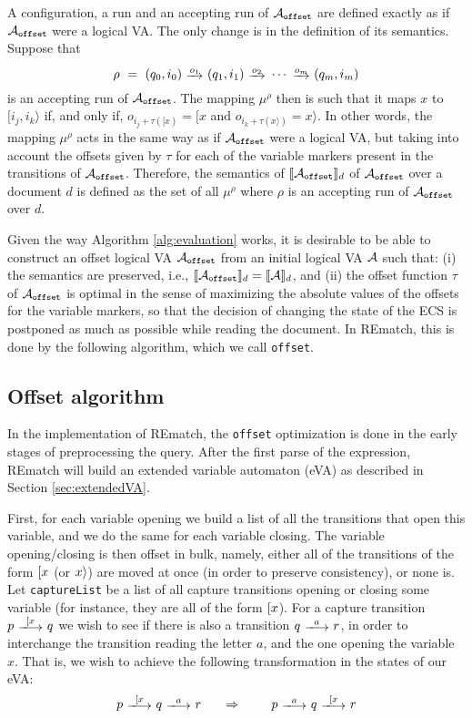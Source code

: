 A configuration, a run and an accepting run of $\mathcal{A}_{\texttt{offset}}$ are defined exactly as
if $\mathcal{A}_{\texttt{offset}}$ were a logical VA. The only change is in the definition of its
semantics. Suppose that 
$$
	\rho \ = \ (q_0, i_0) \ \trans{o_1} \ (q_1, i_1) \ \trans{o_2} \ \cdots \ \trans{o_m} \ (q_m, i_m)
$$
is an accepting run of $\mathcal{A}_{\texttt{offset}}$. The mapping $\mu^\rho$ then is such that it
maps $x$ to $[i_j, i_k\rangle$ if, and only if, $o_{i_j + \tau([x)} = [x$ and
$o_{i_k + \tau(x\rangle)} = x\rangle$. In other words, the mapping $\mu^\rho$
acts in the same way as if $\mathcal{A}_{\texttt{offset}}$ were a logical VA, but taking into account
the offsets given by $\tau$ for each of the variable markers present in the
transitions of $\mathcal{A}_{\texttt{offset}}$. Therefore, the semantics of $\llbracket\mathcal{A}_{\texttt{offset}}\rrbracket_d$ of
$\mathcal{A}_{\texttt{offset}}$ over a document $d$ is defined as the set of all $\mu^\rho$ where
$\rho$ is an accepting run of $\mathcal{A}_{\texttt{offset}}$ over $d$.

Given the way Algorithm \ref*{alg:evaluation} works, it is desirable to be able
to construct an offset logical VA $\mathcal{A}_{\texttt{offset}}$ from an initial logical VA $\mathcal{A}$ such
that: (i) the semantics are preserved, i.e., $\llbracket\mathcal{A}_{\texttt{offset}}\rrbracket_d = \llbracket\mathcal{A}\rrbracket_d$, and
(ii) the offset function $\tau$ of $\mathcal{A}_{\texttt{offset}}$ is optimal in the sense of
maximizing the absolute values of the offsets for the variable markers, so that
the decision of changing the state of the ECS is postponed as much as possible
while reading the document. In REmatch, this is done by the following algorithm,
which we call \texttt{offset}.

\subsection{Offset algorithm}
In the implementation of REmatch, the \texttt{offset} optimization is done in
the early stages of preprocessing the query. After the first parse of the
expression, REmatch will build an extended variable automaton (eVA) as described
in Section \ref{sec:extendedVA}.

First, for each variable opening we build a list of all the transitions that
open this variable, and we do the same for each variable closing. The variable
opening/closing is then offset in bulk, namely, either all of the transitions of
the form $[ x$ (or $x \rangle$) are moved at once (in order to preserve
consistency), or none is. Let \texttt{captureList} be a list of all capture
transitions opening or closing some variable (for instance, they are all of the
form $[ x$). For a capture transition $p\ \longtrans{\Open{x}}\ q$ we wish
to see if there is also a transition $q\ \longtrans{a}\ r$, in order to
interchange the transition reading the letter $a$, and the one opening the
variable $x$. That is, we wish to achieve the following transformation in the
states of our eVA:
$$p\ \longtrans{\Open{x}}\ q\ \longtrans{a}\ r \ \ \ \ \ \Rightarrow \ \ \ \ \ \
\ p\ \longtrans{a}\ q\ \longtrans{\Open{x}}\ r$$


